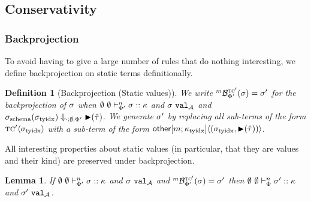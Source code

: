 \documentclass[12pt]{article}
\newtheorem{theorem}{Theorem}
\newtheorem{lemma}{Lemma}
\newtheorem{definition}{Definition}
\begin{document}



\subsection{Conservativity}
\subsubsection{Backprojection}
To avoid having to give a large number of rules that do nothing interesting, we define backprojection on static terms definitionally.%



\begin{definition}[Backprojection (Static values)]
We write ${}^{m}\mathcal{B}_{\Phi'}^{\textsc{tc}'}(\sigma)=\sigma'$ for the backprojection of $\sigma$ when $\emptyset~\emptyset \vdash_{\Phi'}^{n} \sigma :: \kappa$ and $\sigma~\mathtt{val}_{\mathcal{A}}$ and $\sigma_\text{schema}(\sigma_\text{tyidx}) \Downarrow_{\cdot;\emptyset;\Phi'} {\blacktriangleright}(\hat{\tau})$. We generate $\sigma'$ by replacing all sub-terms of the form ${\textsc{tc}'}\langle\sigma_\text{tyidx}\rangle$ with a sub-term of the form ${{\sf other}[m; \kappa_\text{tyidx}]}\langle(\sigma_\text{tyidx}, {\blacktriangleright}(\hat{\tau}))\rangle$. 
\end{definition}

All interesting properties about static values (in particular, that they are values and their kind) are preserved under backprojection.

\begin{lemma}
If $\emptyset~\emptyset \vdash_{\Phi'}^{n} \sigma :: \kappa$ and $\sigma~\mathtt{val}_{\mathcal{A}}$ and ${}^{m}\mathcal{B}_{\Phi'}^{\textsc{tc}'}(\sigma)=\sigma'$ then $\emptyset~\emptyset \vdash_{\Phi}^{n} \sigma' :: \kappa$ and $\sigma'~\mathtt{val}_{\mathcal{A}}$.
\end{lemma}
\end{document}
